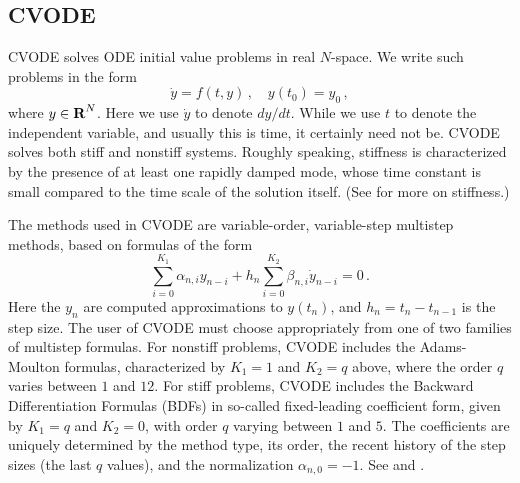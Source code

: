 \subsection{CVODE}\label{ss:cvode}

CVODE solves ODE initial value problems in real $N$-space.  We
write such problems in the form
\begin{equation}\label{ODE}
  \dot{y} = f(t,y) \, ,\quad y(t_0) = y_0 \, ,
\end{equation}
where $y \in \mbox{\bf R}^N$.
Here we use $\dot{y}$ to denote $dy/dt$.  While we use $t$ to denote
the independent variable, and usually this is time, it certainly need
not be.  CVODE solves both stiff and nonstiff systems.  Roughly
speaking, stiffness is characterized by the presence of at least one
rapidly damped mode, whose time constant is small compared to the time
scale of the solution itself.  (See \cite{HaWa:91} for more on stiffness.)

The methods used in CVODE are variable-order, variable-step multistep
methods, based on formulas of the form
\begin{equation*}
 \sum_{i = 0}^{K_1} \alpha_{n,i} y_{n-i} +
     h_n \sum_{i = 0}^{K_2} \beta_{n,i} \dot{y}_{n-i} = 0 \, .
\end{equation*}
Here the $y_n$ are computed approximations to $y(t_n)$, and $h_n = t_n -
t_{n-1}$ is the step size.  The user of CVODE must choose appropriately from
one of two families of multistep formulas.  For nonstiff problems, CVODE
includes the Adams-Moulton formulas, characterized by $K_1 = 1$ and $K_2 =
q$ above, where the order $q$ varies between $1$ and $12$.  For stiff
problems, CVODE includes the Backward Differentiation Formulas (BDFs) in
so-called fixed-leading coefficient form, given by $K_1 = q$ and $K_2 = 0$,
with order $q$ varying between $1$ and $5$.  The coefficients are uniquely
determined by the method type, its order, the recent history of the step
sizes (the last $q$ values), and the normalization $\alpha_{n,0} = -1$.  See
\cite{ByHi:75} and
\cite{JaSD:80}.

